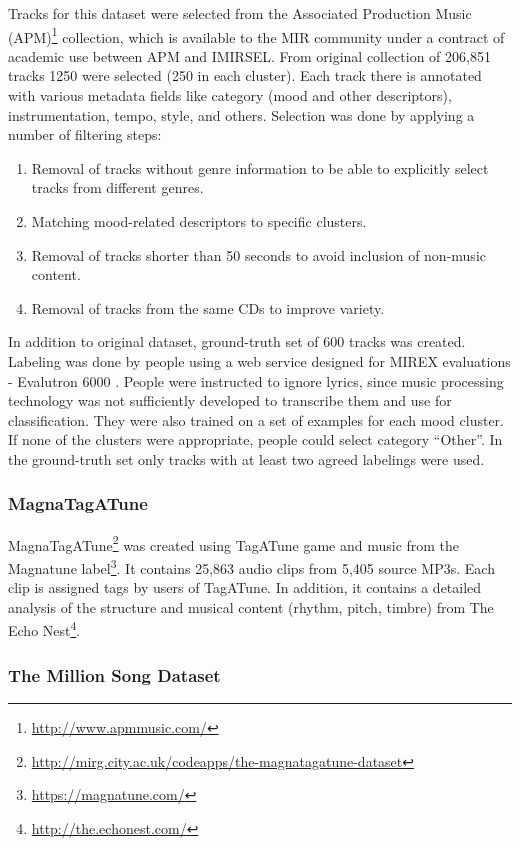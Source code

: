 Tracks for this dataset were selected from the Associated Production Music (APM)\footnote{\url{http://www.apmmusic.com/}} collection, which is available to the MIR community under a contract of academic use between APM and IMIRSEL. From original collection of 206,851 tracks 1250 were selected (250 in each cluster). Each track there is annotated with various metadata fields like category (mood and other descriptors), instrumentation, tempo, style, and others. Selection was done by applying a number of filtering steps:
\begin{enumerate}
    \item Removal of tracks without genre information to be able to explicitly select tracks from different genres.
    \item Matching mood-related descriptors to specific clusters.
    \item Removal of tracks shorter than 50 seconds to avoid inclusion of non-music content.
    \item Removal of tracks from the same CDs to improve variety.
\end{enumerate}

In addition to original dataset, ground-truth set of 600 tracks was created. Labeling was done by people using a web service designed for MIREX evaluations - Evalutron 6000 \cite{gruzd2007evalutron}. People were instructed to ignore lyrics, since music processing technology was not sufficiently developed to transcribe them and use for classification. They were also trained on a set of examples for each mood cluster. If none of the clusters were appropriate, people could select category ``Other''. In the ground-truth set only tracks with at least two agreed labelings were used.

\subsubsection{MagnaTagATune}

MagnaTagATune\footnote{\url{http://mirg.city.ac.uk/codeapps/the-magnatagatune-dataset}} \cite{magnatagatune} was created using TagATune game \cite{tagatune} and music from the Magnatune label\footnote{\url{https://magnatune.com/}}. It contains 25,863 audio clips from 5,405 source MP3s. Each clip is assigned tags by users of TagATune. In addition, it contains a detailed analysis of the structure and musical content (rhythm, pitch, timbre) from The Echo Nest\footnote{\url{http://the.echonest.com/}}.

\subsubsection{The Million Song Dataset}


